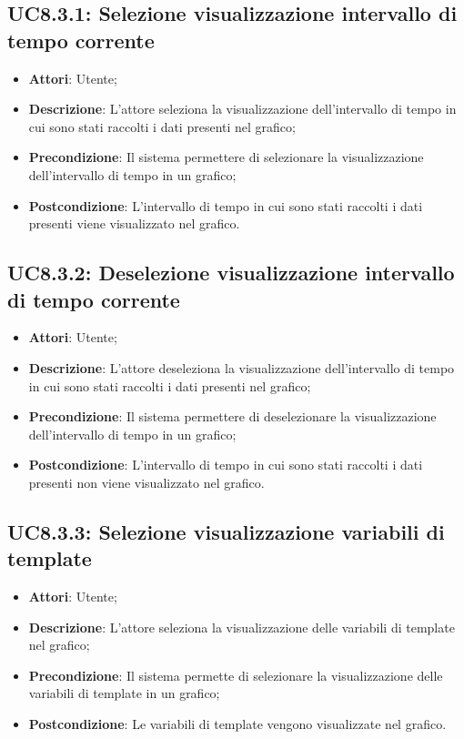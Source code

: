 \subsection{UC8.3.1: Selezione visualizzazione intervallo di tempo corrente}
\begin{itemize}
	\item \textbf{Attori}: Utente;
	\item \textbf{Descrizione}: L'attore seleziona la visualizzazione dell'intervallo di tempo in cui sono stati raccolti i dati presenti nel grafico;
	\item \textbf{Precondizione}: Il sistema permettere di selezionare la visualizzazione dell'intervallo di tempo in un grafico;
	\item \textbf{Postcondizione}: L'intervallo di tempo in cui sono stati raccolti i dati presenti viene visualizzato nel grafico.
\end{itemize}

\subsection{UC8.3.2: Deselezione visualizzazione intervallo di tempo corrente}
\begin{itemize}
	\item \textbf{Attori}: Utente;
	\item \textbf{Descrizione}: L'attore deseleziona la visualizzazione dell'intervallo di tempo in cui sono stati raccolti i dati presenti nel grafico;
	\item \textbf{Precondizione}: Il sistema permettere di deselezionare la visualizzazione dell'intervallo di tempo in un grafico;
	\item \textbf{Postcondizione}: L'intervallo di tempo in cui sono stati raccolti i dati presenti non viene visualizzato nel grafico.
\end{itemize}

\subsection{UC8.3.3: Selezione visualizzazione variabili di template}
\begin{itemize}
	\item \textbf{Attori}: Utente;
	\item \textbf{Descrizione}: L'attore seleziona la visualizzazione delle variabili di template nel grafico;
	\item \textbf{Precondizione}: Il sistema permette di selezionare la visualizzazione delle variabili di template in un grafico;
	\item \textbf{Postcondizione}: Le variabili di template vengono visualizzate nel grafico.
\end{itemize}

